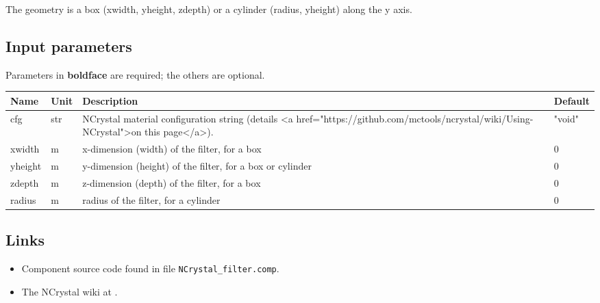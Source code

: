 The geometry is a box (xwidth, yheight, zdepth) or a cylinder (radius, yheight) along the y axis.

\subsection*{Input parameters}
Parameters in \textbf{boldface} are required; the others are optional.

\begin{longtable}{p{}p{}p{}p{}}
\toprule
\textbf{Name} & \textbf{Unit} & \textbf{Description} & \textbf{Default} \\
\midrule
\endhead
cfg & str & NCrystal material configuration string (details \textless{}a href="https://github.com/mctools/ncrystal/wiki/Using-NCrystal"\textgreater{}on this page\textless{}/a\textgreater{}). & "void" \\
xwidth & m & x-dimension (width) of the filter, for a box & 0 \\
yheight & m & y-dimension (height) of the filter, for a box or cylinder & 0 \\
zdepth & m & z-dimension (depth) of the filter, for a box & 0 \\
radius & m & radius of the filter, for a cylinder & 0 \\
\bottomrule
\end{longtable}

\subsection*{Links}
\begin{itemize}
  \item Component source code found in file \texttt{NCrystal\_filter.comp}.
  \item The NCrystal wiki at .
\end{itemize}
